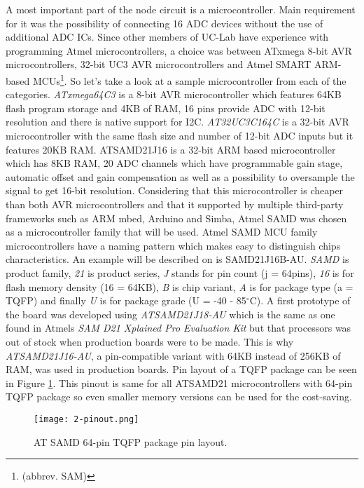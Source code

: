A most important part of the node circuit is a microcontroller. Main requirement for it was the possibility of connecting 16 \ac{ADC} devices without the use of additional \ac{ADC} \ac{IC}s. Since other members of \ac{UC-Lab} have experience with programming Atmel microcontrollers, a choice was between ATxmega 8-bit AVR microcontrollers, 32-bit UC3 AVR microcontrollers and Atmel SMART ARM-based \ac{MCU}s\footnote{(abbrev. SAM)}. So let's take a look at a sample microcontroller from each of the categories. \textit{ATxmega64C3} is a 8-bit AVR microcontroller which features 64KB flash program storage and 4KB of \ac{RAM}, 16 pins provide \ac{ADC} with 12-bit resolution and there is native support for I2C\cite{ATxmega32C3}. \textit{AT32UC3C164C} is a 32-bit AVR microcontroller with the same flash size and number of 12-bit \ac{ADC} inputs but it features 20KB \ac{RAM}\cite{AT32uc3}. ATSAMD21J16 is a 32-bit ARM based microcontroller which has 8KB \ac{RAM}, 20 \ac{ADC} channels which have programmable gain stage, automatic offset and gain compensation as well as a possibility to oversample the signal to get 16-bit resolution\cite{ATSAMD}. Considering that this microcontroller is cheaper than both AVR microcontrollers and that it supported by multiple third-party frameworks such as ARM mbed, Arduino and Simba, Atmel SAMD was chosen as a microcontroller family that will be used. Atmel SAMD \ac{MCU} family microcontrollers have a naming pattern which makes easy to distinguish chips characteristics. An example will be described on is SAMD21J16B-AU. \textit{SAMD} is product family, \textit{21} is product series, \textit{J} stands for pin count (j = 64pins), \textit{16} is for flash memory density (16 = 64KB), \textit{B} is chip variant, \textit{A} is for package type (a = \ac{TQFP}) and finally \textit{U} is for package grade (U = -40 - 85$^{\circ}$C). A first prototype of the board was developed using \textit{ATSAMD21J18-AU} which is the same as one found in Atmels \textit{SAM D21 Xplained Pro Evaluation Kit} but that processors was out of stock when production boards were to be made. This is why \textit{ATSAMD21J16-AU}, a pin-compatible variant with 64KB instead of 256KB of RAM, was used in production boards. Pin layout of a \ac{TQFP} package can be seen in Figure \ref{fig:pinout}. This pinout is same for all ATSAMD21 microcontrollers with 64-pin \ac{TQFP} package so even smaller memory versions can be used for the cost-saving. 

\begin{figure}[h]
  \begin{center}
    \texttt{[image: 2-pinout.png]}
  \end{center}
  \caption{AT SAMD 64-pin TQFP package pin layout.}
  \label{fig:pinout}
\end{figure}

